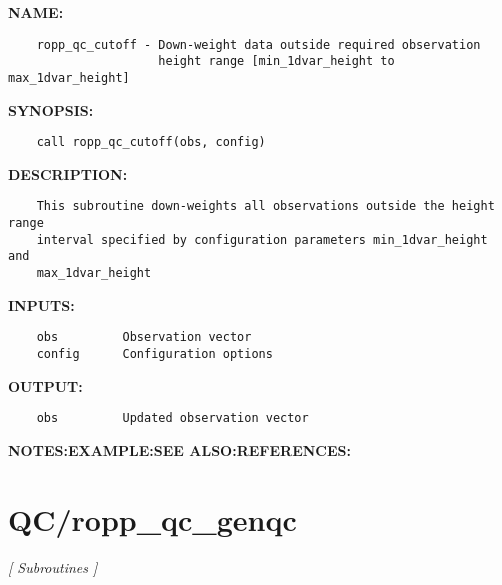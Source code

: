 \label{ch:robo48}
\label{ch:QC_ropp_qc_cutoff}
\textbf{NAME:}\hspace{0.08in}\begin{Verbatim}
    ropp_qc_cutoff - Down-weight data outside required observation
                     height range [min_1dvar_height to max_1dvar_height]
\end{Verbatim}
\textbf{SYNOPSIS:}\hspace{0.08in}\begin{Verbatim}
    call ropp_qc_cutoff(obs, config)
\end{Verbatim}
\textbf{DESCRIPTION:}\hspace{0.08in}\begin{Verbatim}
    This subroutine down-weights all observations outside the height range
    interval specified by configuration parameters min_1dvar_height and
    max_1dvar_height
\end{Verbatim}
\textbf{INPUTS:}\hspace{0.08in}\begin{Verbatim}
    obs         Observation vector
    config      Configuration options
\end{Verbatim}
\textbf{OUTPUT:}\hspace{0.08in}\begin{Verbatim}
    obs         Updated observation vector
\end{Verbatim}
\textbf{NOTES:}\hspace{0.08in}\textbf{EXAMPLE:}\hspace{0.08in}\textbf{SEE ALSO:}\hspace{0.08in}\textbf{REFERENCES:}\hspace{0.08in}\section{QC/ropp\_qc\_genqc}
\textsl{[ Subroutines ]}

